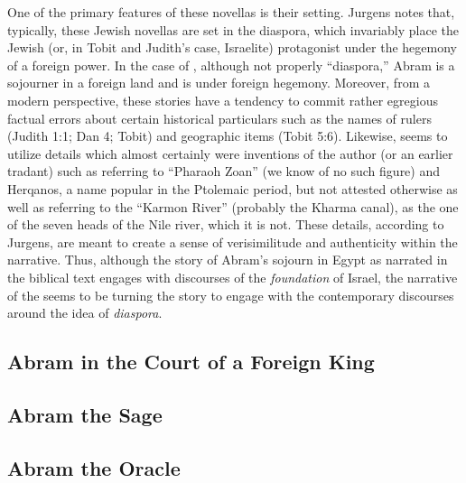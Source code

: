 One of the primary features of these novellas is their setting. Jurgens notes that, typically, these Jewish novellas are set in the diaspora, which invariably place the Jewish (or, in Tobit and Judith's case, Israelite) protagonist under the hegemony of a foreign power. In the case of \ga, although not properly ``diaspora,'' Abram is a sojourner in a foreign land and is under foreign hegemony. Moreover, from a modern perspective, these stories have a tendency to commit rather egregious factual errors about certain historical particulars such as the names of rulers (Judith 1:1; Dan 4; Tobit) and geographic items (Tobit 5:6). Likewise, \ga seems to utilize details which almost certainly were inventions of the author (or an earlier tradant) such as referring to ``Pharaoh Zoan'' (we know of no such figure) and Herqanos, a name popular in the Ptolemaic period, but not attested otherwise as well as referring to the ``Karmon River'' (probably the Kharma canal), as the one of the seven heads of the Nile river, which it is not.\autocites[7]{jurgens_jsj2018}[See also][50--59]{machiela_as2010}[197--199]{fitzmyer2004} These details, according to Jurgens, are meant to create a sense of verisimilitude and authenticity within the narrative. Thus, although the story of Abram's sojourn in Egypt as narrated in the biblical text engages with discourses of the \emph{foundation} of Israel, the narrative of the \ga seems to be turning the story to engage with the contemporary discourses around the idea of \emph{diaspora}.

\subsection{Abram in the Court of a Foreign King}
\subsection{Abram the Sage}
\subsection{Abram the Oracle}